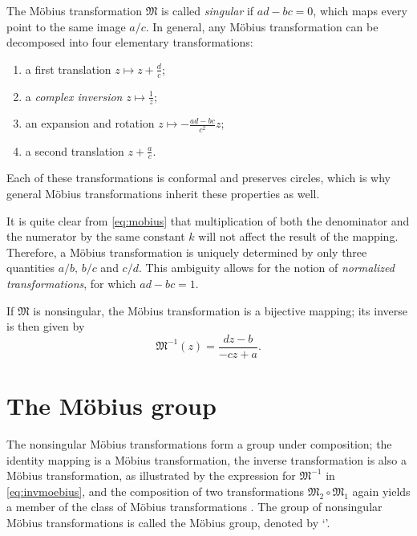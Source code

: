 The Möbius transformation \(\mathfrak{M}\) is called \emph{singular} if \(ad - bc = 0\), which maps every point to the same image \(a/c\). In general, any Möbius transformation can be decomposed into four elementary transformations:
\begin{enumerate}[label=(\roman*), itemsep=0.2ex, topsep=0.3ex]
    \item a first translation \(\displaystyle z \mapsto z + \frac{d}{c}\);
    \item a \emph{complex inversion} \(\displaystyle z \mapsto \frac{1}{z}\);
    \item an expansion and rotation \(\displaystyle z \mapsto -\frac{ad - bc}{c^2}z\);
    \item a second translation \(\displaystyle z + \frac{a}{c}\).
\end{enumerate}
Each of these transformations is conformal and preserves circles, which is why general Möbius transformations inherit these properties as well. 

It is quite clear from \cref{eq:mobius} that multiplication of both the denominator and the numerator by the same constant \(k\) will not affect the result of the mapping. Therefore, a Möbius transformation is uniquely determined by only three quantities \(a/b,\,b/c\) and \(c/d\). This ambiguity allows for the notion of \emph{normalized transformations}, for which \(ad - bc = 1\).

If \(\mathfrak{M}\) is nonsingular, the Möbius transformation is a bijective mapping; its inverse is then given by \cite{Needham1997}
\begin{equation}
    \mathfrak{M}^{-1}(z) = \frac{dz - b}{-cz + a}.
    \label{eq:invmoebius}
\end{equation}

\section{The Möbius group}
\label{sec:mobgroup}
The nonsingular Möbius transformations form a group under composition; the identity mapping is a Möbius transformation, the inverse transformation is also a Möbius transformation, as illustrated by the expression for \(\mathfrak{M}^{-1}\) in \cref{eq:invmoebius}, and the composition of two transformations \(\mathfrak{M}_2 \circ \mathfrak{M}_1\) again yields a member of the class of Möbius transformations \cite{Needham1997}. The group of nonsingular Möbius transformations is called the Möbius group, denoted by `'.

